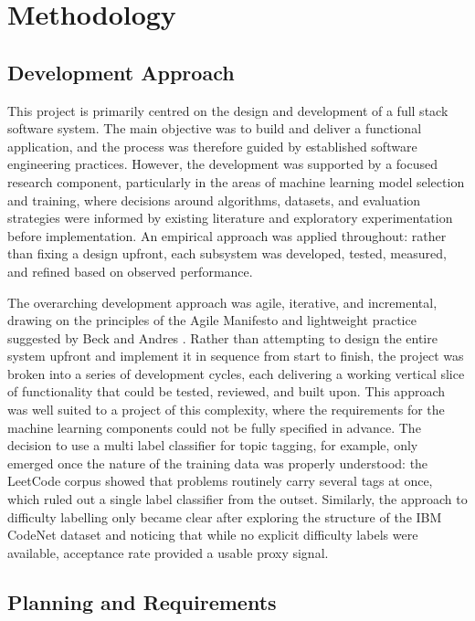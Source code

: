 \chapter{Methodology}

\section{Development Approach}

This project is primarily centred on the design and development of a full stack software system. The main objective was to build and deliver a functional application, and the process was therefore guided by established software engineering practices. However, the development was supported by a focused research component, particularly in the areas of machine learning model selection and training, where decisions around algorithms, datasets, and evaluation strategies were informed by existing literature and exploratory experimentation before implementation. An empirical approach was applied throughout: rather than fixing a design upfront, each subsystem was developed, tested, measured, and refined based on observed performance.

The overarching development approach was agile, iterative, and incremental,
drawing on the principles of the Agile Manifesto \cite{agilemanifesto2001}
and lightweight practice suggested by Beck and Andres \cite{beck2004xp}.
Rather than attempting to design the entire system upfront and implement
it in sequence from start to finish, the project was broken into a series
of development cycles, each delivering a working vertical slice of
functionality that could be tested, reviewed, and built upon. This
approach was well suited to a project of this complexity, where the
requirements for the machine learning components could not be fully
specified in advance. The decision to use a multi label classifier for
topic tagging, for example, only emerged once the nature of the training
data was properly understood: the LeetCode corpus showed that problems
routinely carry several tags at once, which ruled out a single label
classifier from the outset. Similarly, the approach to difficulty labelling
only became clear after exploring the structure of the IBM CodeNet dataset
and noticing that while no explicit difficulty labels were available,
acceptance rate provided a usable proxy signal.

\section{Planning and Requirements}

